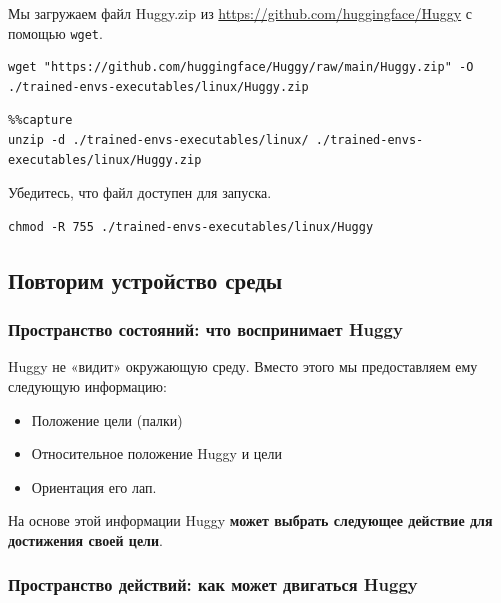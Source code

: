 \documentclass[11pt,a4paper]{article}
\begin{document}
Мы загружаем файл Huggy.zip из \url{https://github.com/huggingface/Huggy} с помощью \texttt{wget}.

\begin{lstlisting}
wget "https://github.com/huggingface/Huggy/raw/main/Huggy.zip" -O ./trained-envs-executables/linux/Huggy.zip
\end{lstlisting}

\begin{lstlisting}
%%capture
unzip -d ./trained-envs-executables/linux/ ./trained-envs-executables/linux/Huggy.zip
\end{lstlisting}

Убедитесь, что файл доступен для запуска.

\begin{lstlisting}
chmod -R 755 ./trained-envs-executables/linux/Huggy
\end{lstlisting}

\subsection{Повторим устройство среды}\label{lets-recap-how-this-environment-works}

\subsubsection{Пространство состояний: что воспринимает Huggy}\label{the-state-space-what-huggy-perceives.-1}

Huggy не «видит» окружающую среду. Вместо этого мы предоставляем ему следующую информацию:

\begin{itemize}
\tightlist
\item
  Положение цели (палки)
\item
  Относительное положение Huggy и цели
\item
  Ориентация его лап.
\end{itemize}

На основе этой информации Huggy \textbf{может выбрать следующее действие для достижения своей цели}.


\subsubsection{Пространство действий: как может двигаться Huggy}\label{the-action-space-what-moves-huggy-can-do}
\end{document}
